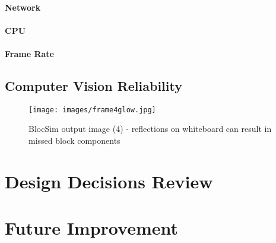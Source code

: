 \paragraph{Network}



\paragraph{CPU}



\paragraph{Frame Rate}



\subsection{Computer Vision Reliability}

\begin{figure}[ht!]
\centering
\texttt{[image: images/frame4glow.jpg]}
\caption{BlocSim output image (4) - reflections on whiteboard can result in missed block components}
\label{im:frame4glow}
\end{figure}


\section{Design Decisions Review}


\section{Future Improvement}





